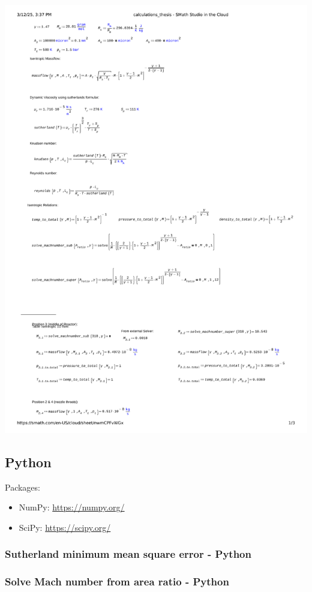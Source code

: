 \includegraphics[page=3, width=\textwidth]{code/smath.pdf}
\newpage

\subsection{Python}
Packages:
\begin{itemize}
	\item NumPy: \quad \url{https://numpy.org/}
	\item SciPy: \quad \url{https://scipy.org/}
\end{itemize}
\subsubsection{Sutherland minimum mean square error - Python}
\label{apx:sutherland-py}


\subsubsection{Solve Mach number from area ratio - Python}
\label{apx:mach-py}

